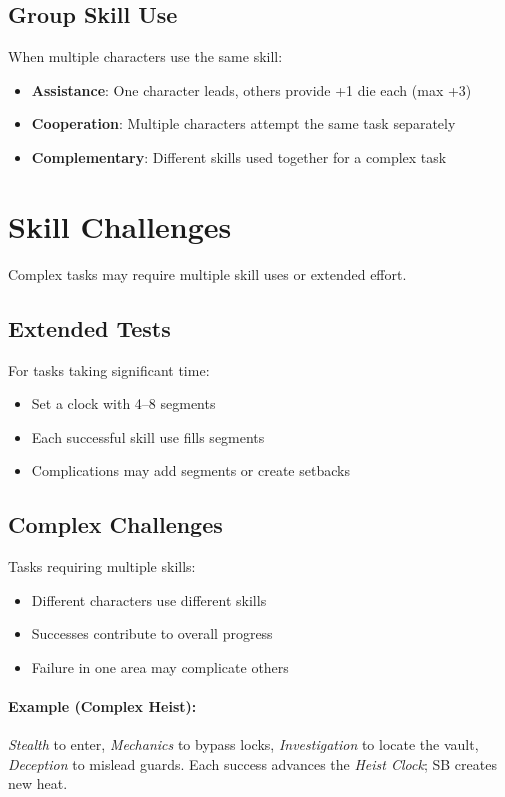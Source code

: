 \begin{multicols}{2}
\subsection*{Group Skill Use}
When multiple characters use the same skill:
\begin{itemize}
\item \textbf{Assistance}: One character leads, others provide +1 die each (max +3)
\item \textbf{Cooperation}: Multiple characters attempt the same task separately
\item \textbf{Complementary}: Different skills used together for a complex task
\end{itemize}

\section{Skill Challenges}

Complex tasks may require multiple skill uses or extended effort.

\subsection*{Extended Tests}
For tasks taking significant time:
\begin{itemize}
\item Set a clock with 4--8 segments
\item Each successful skill use fills segments
\item Complications may add segments or create setbacks
\end{itemize}

\subsection*{Complex Challenges}
Tasks requiring multiple skills:
\begin{itemize}
\item Different characters use different skills
\item Successes contribute to overall progress
\item Failure in one area may complicate others
\end{itemize}

\paragraph{Example (Complex Heist):}
\emph{Stealth} to enter, \emph{Mechanics} to bypass locks, \emph{Investigation} to locate the vault, \emph{Deception} to mislead guards. Each success advances the \emph{Heist Clock}; SB creates new heat.


\end{multicols}
